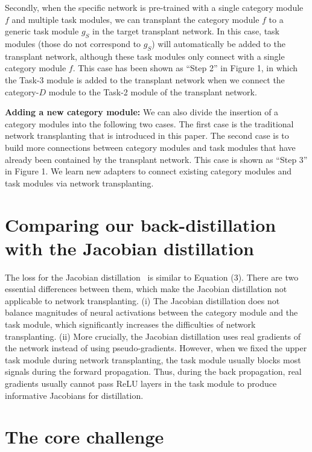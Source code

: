 \documentclass[10pt,twocolumn,letterpaper]{article}
\begin{document}
Secondly, when the specific network is pre-trained with a single category module $f$ and multiple task modules, we can transplant the category module $f$ to a generic task module $g_{S}$ in the target transplant network. In this case, task modules (those do not correspond to $g_{S}$) will automatically be added to the transplant network, although these task modules only connect with a single category module $f$. This case has been shown as ``Step 2'' in Figure 1, in which the Task-3 module is added to the transplant network when we connect the category-$D$ module to the Task-2 module of the transplant network.

\textbf{Adding a new category module:} We can also divide the insertion of a category modules into the following two cases. The first case is the traditional network transplanting that is introduced in this paper. The second case is to build more connections between category modules and task modules that have already been contained by the transplant network. This case is shown as ``Step 3'' in Figure 1. We learn new adapters to connect existing category modules and task modules via network transplanting.



\section*{Comparing our back-distillation with the Jacobian distillation}

The loss for the Jacobian distillation~\cite{distillJacobian} is similar to Equation (3). There are two essential differences between them, which make the Jacobian distillation not applicable to network transplanting. (i) The Jacobian distillation does not balance magnitudes of neural activations between the category module and the task module, which significantly increases the difficulties of network transplanting. (ii) More crucially, the Jacobian distillation uses real gradients of the network instead of using pseudo-gradients. However, when we fixed the upper task module during network transplanting, the task module usually blocks most signals during the forward propagation. Thus, during the back propagation, real gradients usually cannot pass ReLU layers in the task module to produce informative Jacobians for distillation.

\section*{The core challenge}
\end{document}
